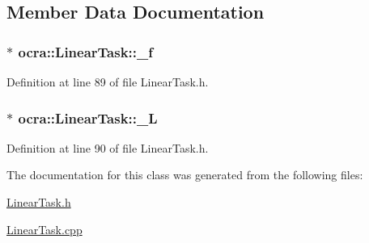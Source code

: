 \subsection{Member Data Documentation}
\subsubsection[{\texorpdfstring{\+\_\+f}{_f}}]{$\ast$ ocra\+::\+Linear\+Task\+::\+\_\+f\hspace{0.3cm}{\ttfamily [protected]}}\hypertarget{classocra_1_1LinearTask_ab79a5c0caf93e7ecbc214ad40a8d2701}{}\label{classocra_1_1LinearTask_ab79a5c0caf93e7ecbc214ad40a8d2701}


Definition at line 89 of file Linear\+Task.\+h.

\subsubsection[{\texorpdfstring{\+\_\+L}{_L}}]{$\ast$ ocra\+::\+Linear\+Task\+::\+\_\+L\hspace{0.3cm}{\ttfamily [protected]}}\hypertarget{classocra_1_1LinearTask_a9ce434a1d6641d486c20476b8f8a366d}{}\label{classocra_1_1LinearTask_a9ce434a1d6641d486c20476b8f8a366d}


Definition at line 90 of file Linear\+Task.\+h.



The documentation for this class was generated from the following files\+:\begin{DoxyCompactItemize}
\item 
\hyperlink{LinearTask_8h}{Linear\+Task.\+h}\item 
\hyperlink{LinearTask_8cpp}{Linear\+Task.\+cpp}\end{DoxyCompactItemize}
